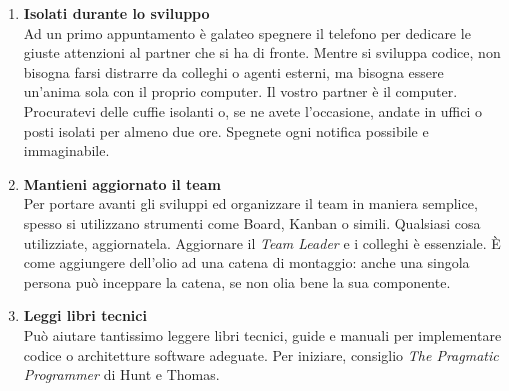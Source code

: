 \begin{enumerate}
\item \textbf{Isolati durante lo sviluppo} \\
Ad un primo appuntamento è galateo spegnere il telefono per dedicare le giuste attenzioni al partner che si ha di fronte. Mentre si sviluppa codice, non bisogna farsi distrarre da colleghi o agenti esterni, ma bisogna essere un’anima sola con il proprio computer. Il vostro partner è il computer. Procuratevi delle cuffie isolanti o, se ne avete l’occasione, andate in uffici o posti isolati per almeno due ore. Spegnete ogni notifica possibile e immaginabile.

\item \textbf{Mantieni aggiornato il team} \\
Per portare avanti gli sviluppi ed organizzare il team in maniera semplice, spesso si utilizzano strumenti come Board, Kanban o simili. Qualsiasi cosa utilizziate, aggiornatela. Aggiornare il \emph{Team Leader} e i colleghi è essenziale. È come aggiungere dell’olio ad una catena di montaggio: anche una singola persona può inceppare la catena, se non olia bene la sua componente.

\item \textbf{Leggi libri tecnici} \\
Può aiutare tantissimo leggere libri tecnici, guide e manuali per implementare codice o architetture software adeguate. Per iniziare, consiglio \emph{The Pragmatic Programmer} di Hunt e Thomas.

\end{enumerate}
